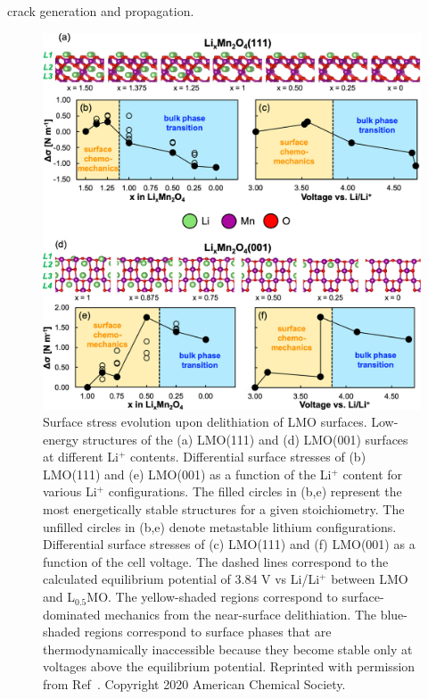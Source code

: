 \documentclass[../main.tex]{subfiles}
\begin{document}
crack generation and propagation. \cite{liang2018ab}

\begin{figure}
    \centering
    \includegraphics[scale=0.7]{figures/cathode_surface_stress.jpg}
    \caption{Surface stress evolution upon delithiation of LMO surfaces. Low-energy structures of the (a) LMO(111) and (d) LMO(001) surfaces at different Li$^+$ contents. Differential surface stresses of (b) LMO(111) and (e) LMO(001) as a function of the Li$^+$ content for various Li$^+$ configurations. The filled circles in (b,e) represent the most energetically stable structures for a given stoichiometry. The unfilled circles in (b,e) denote metastable lithium configurations. Differential surface stresses of (c) LMO(111) and (f) LMO(001) as a function of the cell voltage. The dashed lines correspond to the calculated equilibrium potential of 3.84 V vs Li/Li$^+$ between LMO and L$_{0.5}$MO. The yellow-shaded regions correspond to surface-dominated mechanics from the near-surface delithiation. The blue-shaded regions correspond to surface phases that are thermodynamically inaccessible because they become stable only at voltages above the equilibrium potential. Reprinted with permission from Ref~\cite{warburton2020oriented}. Copyright 2020 American Chemical Society.}
    \label{fig:cathode_surface_stress}
\end{figure}
\end{document}
